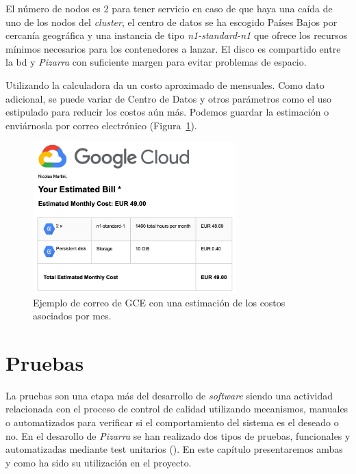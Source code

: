 \documentclass[11pt,spanish,listoffigures,listoftables]{tfgetsinf}
\begin{document}
El número de nodos es 2 para tener servicio en caso de que haya una caída de uno de los nodos del \textit{cluster}, el centro de datos se ha escogido Países Bajos por cercanía geográfica y una instancia de tipo \textit{n1-standard-n1} que ofrece los recursos mínimos necesarios para los contenedores a lanzar. El disco es compartido entre la \acrshort{bd} y \textit{Pizarra} con suficiente margen para evitar problemas de espacio.

Utilizando la calculadora da un costo aproximado de  mensuales. Como dato adicional, se puede variar de Centro de Datos y otros parámetros como el uso estipulado para reducir los costos aún más. Podemos guardar la estimación o enviárnosla por correo electrónico (Figura~\ref{figura:gce-estimated-cost-email}).

\begin{figure}
	\centering
	\includegraphics[width=0.70\textwidth]{img/google-cloud-engine-estimated-cost}
	\caption[Estimación de costos en GCE]{Ejemplo de correo de GCE con una estimación de los costos asociados por mes.}
	\label{figura:gce-estimated-cost-email}
\end{figure}

\chapter{Pruebas}

La pruebas son una etapa más del desarrollo de \textit{software} siendo una actividad relacionada con el proceso de control de calidad utilizando mecanismos, manuales o automatizados para verificar si el comportamiento del sistema es el deseado o no. En el desarollo de \textit{Pizarra} se han realizado dos tipos de pruebas, funcionales y automatizadas mediante test unitarios (). En este capítulo presentaremos ambas y como ha sido su utilización en el proyecto.
\end{document}
